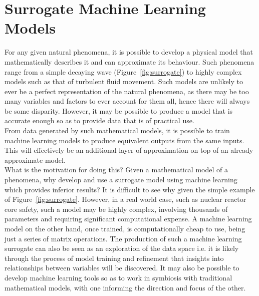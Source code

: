 \section{Surrogate Machine Learning Models} \label{Surrogate}

For any given natural phenomena, it is possible to develop a physical model that mathematically describes it and can approximate its behaviour. Such phenomena range from a simple decaying wave (Figure~\ref{fig:surrogate}) to highly complex models such as that of turbulent fluid movement. Such models are unlikely to ever be a perfect representation of the natural phenomena, as there may be too many variables and factors to ever account for them all, hence there will always be some disparity. However, it may be possible to produce a model that is accurate enough so as to provide data that is of practical use.
\\

\noindent
From  data generated by such mathematical models, it is possible to train machine learning models to produce equivalent outputs from the same inputs. This will effectively be an additional layer of approximation on top of an already approximate model.
\\

\noindent
What is the motivation for doing this? Given a mathematical model of a phenomena, why develop and use a surrogate model using machine learning which provides inferior results? It is difficult to see why given the simple example of Figure~\ref{fig:surrogate}. However, in a real world case, such as nuclear reactor core safety, such a model may be highly complex, involving thousands of parameters and requiring significant computational expense. A machine learning model on the other hand, once trained, is computationally cheap to use, being just a series of matrix operations. The production of such a machine learning surrogate can also be seen as an exploration of the data space i.e. it is likely through the process of model training and refinement that insights into relationships between variables will be discovered. It may also be possible to develop machine learning tools so as to work in symbiosis with traditional mathematical models, with one informing the direction and focus of the other.
\\

